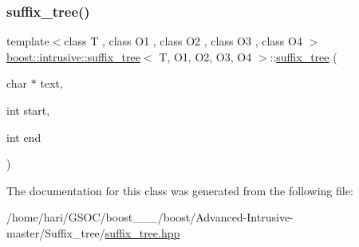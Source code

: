 \subsubsection{\texorpdfstring{suffix\+\_\+tree()}{suffix\_tree()}}
{\footnotesize\ttfamily template$<$class T , class O1 , class O2 , class O3 , class O4 $>$ \\
\hyperlink{classboost_1_1intrusive_1_1suffix__tree}{boost\+::intrusive\+::suffix\+\_\+tree}$<$ T, O1, O2, O3, O4 $>$\+::\hyperlink{classboost_1_1intrusive_1_1suffix__tree}{suffix\+\_\+tree} (\begin{DoxyParamCaption}\item[{char $\ast$}]{text,  }\item[{int}]{start,  }\item[{int}]{end }\end{DoxyParamCaption})\hspace{0.3cm}{\ttfamily [inline]}}



The documentation for this class was generated from the following file\+:\begin{DoxyCompactItemize}
\item 
/home/hari/\+G\+S\+O\+C/boost\+\_\+\_\+\_/boost/\+Advanced-\/\+Intrusive-\/master/\+Suffix\+\_\+tree/\hyperlink{suffix__tree_8hpp}{suffix\+\_\+tree.\+hpp}\end{DoxyCompactItemize}
